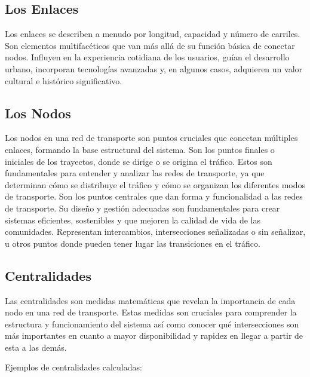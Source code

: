 \documentclass[12pt]{article}
\begin{document}
\subsection{Los Enlaces}

Los enlaces se describen a menudo por longitud, capacidad y número de carriles. Son elementos multifacéticos que van más allá de su función básica de conectar nodos. Influyen en la experiencia cotidiana de los usuarios, guían el desarrollo urbano, incorporan tecnologías avanzadas y, en algunos casos, adquieren un valor cultural e histórico significativo.

\subsection{Los Nodos}

Los nodos en una red de transporte son puntos cruciales que conectan múltiples enlaces, formando la base estructural del sistema. Son los puntos finales o iniciales de los trayectos, donde se dirige o se origina el tráfico. Estos son fundamentales para entender y analizar las redes de transporte, ya que determinan cómo se distribuye el tráfico y cómo se organizan los diferentes modos de transporte. Son los puntos centrales que dan forma y funcionalidad a las redes de transporte. Su diseño y gestión adecuadas son fundamentales para crear sistemas eficientes, sostenibles y que mejoren la calidad de vida de las comunidades. Representan intercambios, intersecciones señalizadas o sin señalizar, u otros puntos donde pueden tener lugar las transiciones en el tráfico.

\subsection{Centralidades}

Las centralidades son medidas matemáticas que revelan la importancia de cada nodo en una red de transporte. Estas medidas son cruciales para comprender la estructura y funcionamiento del sistema así como conocer qué intersecciones son más importantes en cuanto a mayor disponibilidad y rapidez en llegar a partir de esta a las demás.

Ejemplos de centralidades calculadas:
\end{document}
